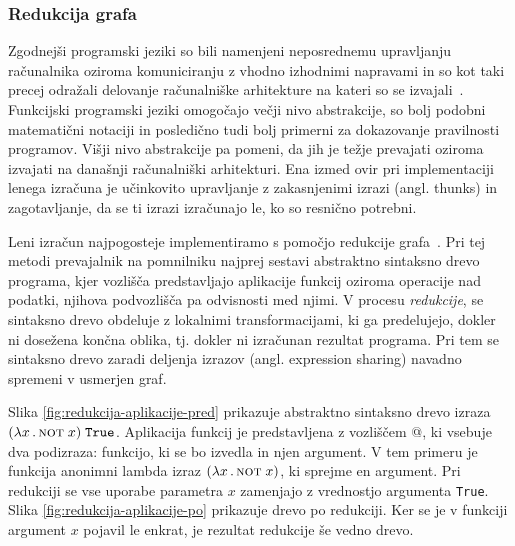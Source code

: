 
\subsubsection{Redukcija grafa}

Zgodnejši programski jeziki so bili namenjeni neposrednemu upravljanju ra\-ču\-nal\-ni\-ka oziroma komuniciranju z vhodno izhodnimi napravami in so kot taki precej odražali delovanje računalniške arhitekture na kateri so se izvajali~\cite{hudak1989conception}. Funkcijski programski jeziki omogočajo večji nivo abstrakcije, so bolj podobni matematični notaciji in posledično tudi bolj primerni za dokazovanje pravilnosti programov. Višji nivo abstrakcije pa pomeni, da jih je težje prevajati oziroma izvajati na današnji računalniški arhitekturi. Ena izmed ovir pri implementaciji lenega izračuna je učinkovito upravljanje z zakasnjenimi izrazi (angl. thunks) in zagotavljanje, da se ti izrazi izračunajo le, ko so resnično potrebni.

Leni izračun najpogosteje implementiramo s pomočjo redukcije gra\-fa~\cite{peyton1987implementation, hudak1989conception}. Pri tej metodi prevajalnik na pomnilniku najprej sestavi abstraktno sintaksno drevo programa, kjer vozlišča predstavljajo aplikacije funkcij oziroma operacije nad podatki, njihova podvozlišča pa odvisnosti med njimi. V procesu \textit{redukcije}, se sintaksno drevo obdeluje z lokalnimi transformacijami, ki ga predelujejo, dokler ni dosežena končna oblika, tj. dokler ni izračunan rezultat programa. Pri tem se sintaksno drevo zaradi deljenja izrazov (angl. expression sharing) navadno spremeni v usmerjen graf.

Slika \ref{fig:redukcija-aplikacije-pred} prikazuje abstraktno sintaksno drevo izraza $(\lambda x \, . \, \textsc{not} \; x) \; \texttt{True}$. Aplikacija funkcij je predstavljena z vozliščem @, ki vsebuje dva podizraza: funkcijo, ki se bo izvedla in njen argument. V tem primeru je funkcija anonimni lambda izraz $(\lambda x \, . \, \textsc{not} \; x)$, ki sprejme en argument. Pri redukciji se vse uporabe parametra $x$ zamenjajo z vrednostjo argumenta \texttt{True}. Slika \ref{fig:redukcija-aplikacije-po} prikazuje drevo po redukciji. Ker se je v funkciji argument $x$ pojavil le enkrat, je rezultat redukcije še vedno drevo.


